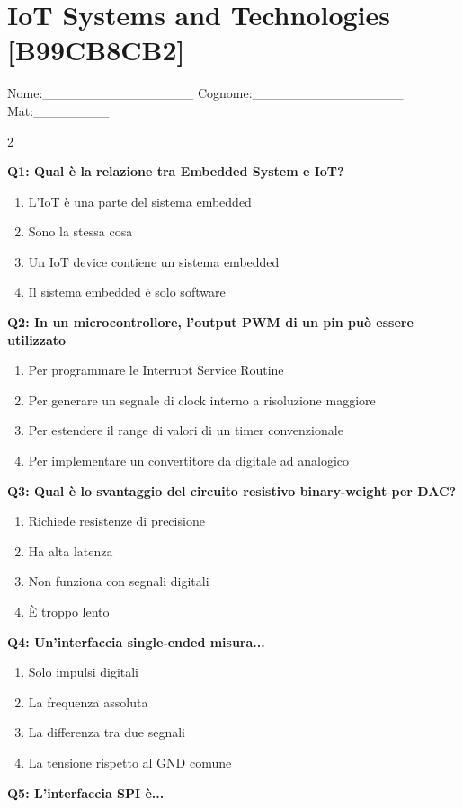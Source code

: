 \documentclass[10pt]{article}
\begin{document}
\newpage

\section*{IoT Systems and Technologies \footnotesize [B99CB8CB2]}
{\footnotesize Nome:\_\_\_\_\_\_\_\_\_\_\_\_\_\_\_\_ Cognome:\_\_\_\_\_\_\_\_\_\_\_\_\_\_\_\_ Mat:\_\_\_\_\_\_\_\_}
\begin{multicols}{2}

\textbf{Q1: Qual è la relazione tra Embedded System e IoT?}

\begin{enumerate}[label=\arabic*.]
\item L’IoT è una parte del sistema embedded
\item Sono la stessa cosa
\item Un IoT device contiene un sistema embedded
\item Il sistema embedded è solo software
\end{enumerate}
\textbf{Q2: In un microcontrollore, l'output PWM di un pin può essere utilizzato}

\begin{enumerate}[label=\arabic*.]
\item Per programmare le Interrupt Service Routine
\item Per generare un segnale di clock interno a risoluzione maggiore
\item Per estendere il range di valori di un timer convenzionale
\item Per implementare un convertitore da digitale ad analogico
\end{enumerate}
\textbf{Q3: Qual è lo svantaggio del circuito resistivo binary-weight per DAC?}

\begin{enumerate}[label=\arabic*.]
\item Richiede resistenze di precisione
\item Ha alta latenza
\item Non funziona con segnali digitali
\item È troppo lento
\end{enumerate}
\textbf{Q4: Un’interfaccia single-ended misura...}

\begin{enumerate}[label=\arabic*.]
\item Solo impulsi digitali
\item La frequenza assoluta
\item La differenza tra due segnali
\item La tensione rispetto al GND comune
\end{enumerate}
\textbf{Q5: L'interfaccia SPI è...}


\end{multicols}
\end{document}
